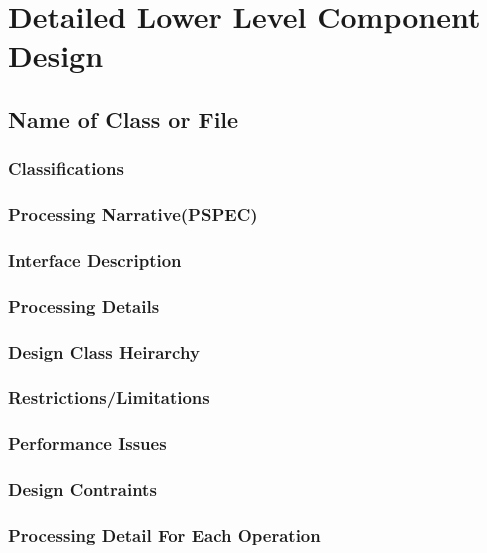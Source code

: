 \section{Detailed Lower Level Component Design}
\label{sec:lower}

\subsection{Name of Class or File}
\label{sec:class}

\subsubsection{Classifications}
\label{sec:classifications}

\subsubsection{Processing Narrative(PSPEC)}
\label{sec:pspec}

\subsubsection{Interface Description}
\label{sec:interface}

\subsubsection{Processing Details}
\label{sec:details}

\subsubsection{Design Class Heirarchy}
\label{sec:heirarchy}

\subsubsection{Restrictions/Limitations}
\label{sec:restrictions}

\subsubsection{Performance Issues}
\label{sec:performance}

\subsubsection{Design Contraints}
\label{sec:designconstraints}

\subsubsection{Processing Detail For Each Operation}
\label{sec:operation}

